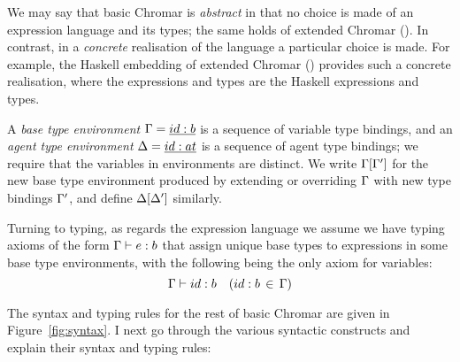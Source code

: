 We may say that basic Chromar is \emph{abstract} in that no choice is made of an
expression language and its types; the same holds of extended Chromar
().  In contrast, in a \emph{concrete} realisation of the
language a particular choice is made.  For example, the Haskell embedding of
extended Chromar () provides such a concrete realisation, where
the expressions and types are the Haskell expressions and types.

A \emph{base type environment} $\Gamma = \underline{id:b}$ is a sequence of variable type
bindings, and an \emph{agent type environment} $\Delta = \underline{id:at}$ is a sequence of
agent type bindings; we require that the variables in environments are distinct.
We write $\Gamma[\Gamma']$ for the new base type environment produced by extending or
overriding $\Gamma$ with new type bindings $\Gamma'$, and define $\Delta[\Delta']$ similarly.

Turning to typing, as regards the expression language we assume we have typing
axioms of the form $\Gamma \vdash e : b$ that assign unique base types to expressions in
some base type environments, with the following being the only axiom for
variables:
 \[\Gamma \vdash id:b  \quad (id:b \, \in \, \Gamma)\]

 The syntax and typing rules for the rest of basic Chromar are given in
 Figure~\ref{fig:syntax}. I next go through the various syntactic constructs
 and explain their syntax and typing rules:

